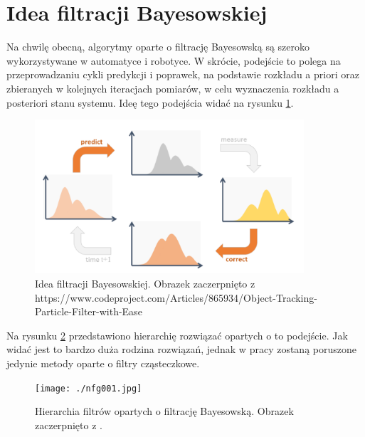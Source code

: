 \section{Idea filtracji Bayesowskiej}
Na chwilę obecną, algorytmy oparte o filtrację Bayesowską są szeroko wykorzystywane w automatyce i robotyce. W skrócie, podejście to polega na przeprowadzaniu cykli predykcji i poprawek, na podstawie rozkładu a priori oraz zbieranych w kolejnych iteracjach pomiarów, w celu wyznaczenia rozkładu a posteriori stanu systemu. Ideę tego podejścia widać na rysunku \ref{bayes_fil_idea}. 
\begin{figure}[H]
	\begin{center}
		\includegraphics[width=10cm]{./predict_update.png}
		\caption{Idea filtracji Bayesowskiej. Obrazek zaczerpnięto z https://www.codeproject.com/Articles/865934/Object-Tracking-Particle-Filter-with-Ease}
		\label{bayes_fil_idea}
	\end{center}
\end{figure}
Na rysunku \ref{filtr_hier} przedstawiono hierarchię rozwiązać opartych o to podejście. Jak widać jest to bardzo duża rodzina rozwiązań, jednak w pracy zostaną poruszone jedynie metody oparte o filtry cząsteczkowe.
\begin{figure}[H]
	\begin{center}
		\texttt{[image: ./nfg001.jpg]}
		\caption{Hierarchia filtrów opartych o filtrację Bayesowską. Obrazek zaczerpnięto z \cite{prac_gui}.} \label{filtr_hier}
	\end{center}
\end{figure}
